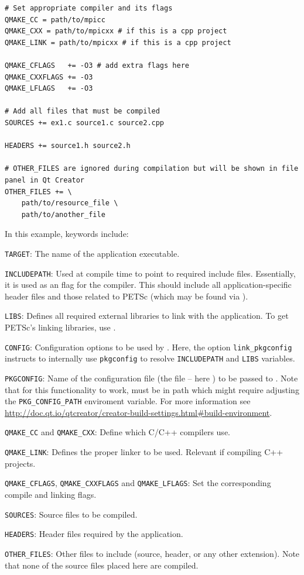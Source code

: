 {{\begin{lstlisting}
# Set appropriate compiler and its flags
QMAKE_CC = path/to/mpicc
QMAKE_CXX = path/to/mpicxx # if this is a cpp project
QMAKE_LINK = path/to/mpicxx # if this is a cpp project

QMAKE_CFLAGS   += -O3 # add extra flags here
QMAKE_CXXFLAGS += -O3
QMAKE_LFLAGS   += -O3

# Add all files that must be compiled
SOURCES += ex1.c source1.c source2.cpp

HEADERS += source1.h source2.h

# OTHER_FILES are ignored during compilation but will be shown in file panel in Qt Creator
OTHER_FILES += \
	path/to/resource_file \
	path/to/another_file
\end{lstlisting}

In this example, keywords include:
\begin{tightitemize}
\item \lstinline{TARGET}: The name of the application executable.
\item \lstinline{INCLUDEPATH}: Used at compile time to point to required include files. Essentially, it is used as an  flag for the compiler. This should include all application-specific header files and those related to PETSc (which may be found via ).
\item \lstinline{LIBS}: Defines all required external libraries to link with the application. To get PETSc's linking libraries, use .
\item \lstinline{CONFIG}: Configuration options to be used by \trl{qmake}. Here, the option \lstinline{link_pkgconfig} instructs \trl{qmake} to internally 
  use \lstinline{pkgconfig} to resolve \lstinline{INCLUDEPATH} and \lstinline{LIBS} variables.
\item \lstinline{PKGCONFIG}: Name of the configuration file (the \trl{.pc} file -- here ) to be passed to \trl{pkgconfig}. Note that for this functionality to work, \trl{PETSc.pc} must be in path which might require adjusting the \lstinline{PKG_CONFIG_PATH} enviroment variable. 
  For more information see \url{http://doc.qt.io/qtcreator/creator-build-settings.html#build-environment}.
\item \lstinline{QMAKE_CC} and \lstinline{QMAKE_CXX}: Define which C/C++ compilers use.
\item \lstinline{QMAKE_LINK}: Defines the proper linker to be used. Relevant if compiling C++ projects.
\item \lstinline{QMAKE_CFLAGS}, \lstinline{QMAKE_CXXFLAGS} and \lstinline{QMAKE_LFLAGS}: Set the corresponding compile and linking flags.
\item \lstinline{SOURCES}: Source files to be compiled.
\item \lstinline{HEADERS}: Header files required by the application. 
\item \lstinline{OTHER_FILES}: Other files to include (source, header, or any other extension). Note that none of the source files placed here are compiled.
\end{tightitemize}

}}
